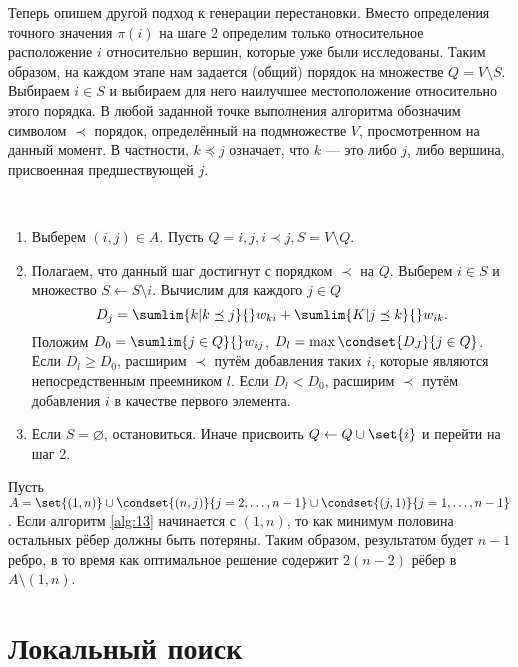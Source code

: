 \documentclass[a4paper, 12pt, oneside]{extarticle}  %
\begin{document}
Теперь опишем другой подход к генерации перестановки. Вместо определения точного значения $\pi(i)$ на шаге 2 определим только относительное расположение $i$ относительно вершин, которые уже были исследованы. Таким образом, на каждом этапе нам задается (общий) порядок на множестве $Q=V\setminus S$. Выбираем $i \in S$ и выбираем для него наилучшее местоположение относительно этого порядка. В любой заданной точке выполнения алгоритма обозначим символом $\prec$ порядок, определённый на подмножестве $V$, просмотренном на данный момент. В частности, $k \preceq j$ означает, что $k$ --- это либо $j$, либо вершина, присвоенная предшествующей $j$.

\begin{algo}\label{alg:13}\ \par
  \begin{enumerate}[label=\arabic*)]
    \item Выберем $(i,j) \in A$. Пусть $Q={i,j}, i \prec j, S = V \setminus Q$.
    \item Полагаем, что данный шаг достигнут с порядком $\prec$ на $Q$. Выберем $i \in S$ и множество $S \leftarrow S \setminus i$. Вычислим для каждого $j \in Q$
          \[D_j = \sumlim{k|k\preceq j}{}w_{ki} + \sumlim{K|j\preceq k}{}w_{ik}.\]
          Положим $D_0 = \sumlim{j \in Q}{} w_{ij}$, $D_l = \max\condset{D_J}{j \in Q}$. Если $D_l \ge D_0$, расширим $\prec$ путём добавления таких $i$, которые являются непосредственным преемником $l$. Если $D_l < D_0$, расширим $\prec$ путём добавления $i$ в качестве первого элемента.
    \item Если $S = \varnothing$, остановиться. Иначе присвоить $Q \leftarrow Q \cup \set{i}$ и перейти на шаг 2.
  \end{enumerate}
\end{algo}

\begin{example}
  Пусть $A = \set{(1,n)} \cup \condset{(n,j)}{j= 2,\ldots, n-1} \cup \condset{(j,1)}{j=1,\ldots,n-1}$. Если алгоритм \ref{alg:13} начинается с $(1,n)$, то как минимум половина остальных рёбер должны быть потеряны. Таким образом, результатом будет $n-1$ ребро, в то время как оптимальное решение содержит $2(n-2)$ рёбер в $A \setminus (1,n)$.
\end{example}


\section{Локальный поиск}
\end{document}
